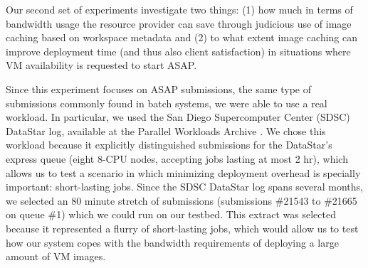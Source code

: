 \documentclass[singlespace]{ccw_chithesis}
\begin{document}
Our second set of experiments investigate two things: (1) how much in
terms of bandwidth usage the resource provider can save through
judicious use of image caching based on workspace metadata and (2) to
what extent image caching can improve deployment time (and thus also
client satisfaction) in situations where VM availability is requested
to start ASAP. 

Since this experiment focuses on ASAP submissions, the same type of
submissions commonly found in batch systems, we were able to use a real
workload. In particular, we used the San Diego Supercomputer Center
(SDSC) DataStar log, available at the Parallel Workloads Archive \cite{BorjaCite21}.
We chose this workload because it explicitly distinguished submissions
for the DataStar's express queue (eight 8{}-CPU nodes, accepting jobs
lasting at most 2 hr), which allows us to test a scenario in which
minimizing deployment overhead is specially important: short{}-lasting
jobs. Since the SDSC DataStar log spans several months, we selected an
80 minute stretch of submissions (submissions \#21543 to \#21665 on
queue \#1) which we could run on our testbed. This extract was selected
because it represented a flurry of short{}-lasting jobs, which would
allow us to test how our system copes with the bandwidth requirements
of deploying a large amount of VM images.
\end{document}
